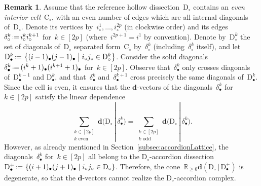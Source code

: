 \documentclass{amsart}
\theoremstyle{definition}
\newtheorem{remark}[theorem]{Remark}
\newcommand{\R}{\mathbb{R}} %
\renewcommand{\b}[1]{\mathbf{#1}} %
\newcommand{\set}[2]{\left\{ #1 \;\middle|\; #2 \right\}} %
\newcommand{\eqdef}{\mbox{\,\raisebox{0.2ex}{\scriptsize\ensuremath{\mathrm:}}\ensuremath{=}\,}} %
\newcommand{\darkblue}{\color{darkblue}} %
\newcommand{\defn}[1]{\textsl{\darkblue #1}} %
\newcommand{\dissection}{\mathrm{D}} %
\newcommand{\cell}{\mathrm{C}} %
\newcommand{\bigdvector}[2]{\mathbf{d} \big( #1  \,|\, #2 \big)} %
\newcommand{\dvectors}[2]{\mathbf{d}(#1 \,|\, #2)} %
\newcommand{\ma}{+} %
\begin{document}
\begin{remark}
Assume that the reference hollow dissection~$\dissection_\circ$ contains an \defn{even interior cell}~$\cell_\circ$, with an even number of edges which are all internal diagonals of~$\dissection_\circ$. Denote its vertices by~$i_\circ^1, \dots, i_\circ^{2p}$ (in clockwise order) and its edges~$\delta_\circ^k \eqdef i_\circ^k i_\circ^{k+1}$ for~$k \in [2p]$ (where~$i^{2p+1} = i^1$ by convention). Denote by~$\dissection_\circ^k$ the set of diagonals of~$\dissection_\circ$ separated form~$\cell_\circ$ by~$\delta_\circ^k$ (including~$\delta_\circ^k$ itself), and let~$\dissection_\bullet^k \eqdef \set{(i-1)_\bullet (j-1)_\bullet}{i_\circ j_\circ \in \dissection_\circ^k}$. Consider the solid diagonals~$\delta_\bullet^k \eqdef (i^k+1)_\bullet (i^{k+1}+1)_\bullet$ for~$k \in [2p]$. Observe that~$\delta_\bullet^k$ only crosses diagonals of~$\dissection_\bullet^{k-1}$ and $\dissection_\bullet^k$, and that~$\delta_\bullet^k$ and~$\delta_\bullet^{k+1}$ cross precisely the same diagonals of~$\dissection_\bullet^k$. Since the cell is even, it ensures that the $\b{d}$-vectors of the diagonals~$\delta_\bullet^k$ for~$k \in [2p]$ satisfy the linear dependence
\[
\sum_{\substack{k \in [2p] \\ k \text{ even}}} \bigdvector{\dissection_\circ}{\delta_\bullet^k} = \sum_{\substack{k \in [2p] \\ k \text{ odd}}} \bigdvector{\dissection_\circ}{\delta_\bullet^k}.
\]
However, as already mentioned in Section~\ref{subsec:accordionLattice}, the diagonals~$\delta_\bullet^k$ for~$k \in [2p]$ all belong to the $\dissection_\circ$-accordion dissection~$\dissection_\bullet^\ma \eqdef \set{(i+1)_\bullet (j+1)_\bullet}{i_\circ j_\circ \in \dissection_\circ}$. Therefore, the cone~$\R_{\ge0} \dvectors{\dissection_\circ}{\dissection_\bullet^\ma}$ is degenerate, so that the $\b{d}$-vectors cannot realize the $\dissection_\circ$-accordion complex.
\end{remark}
\end{document}
